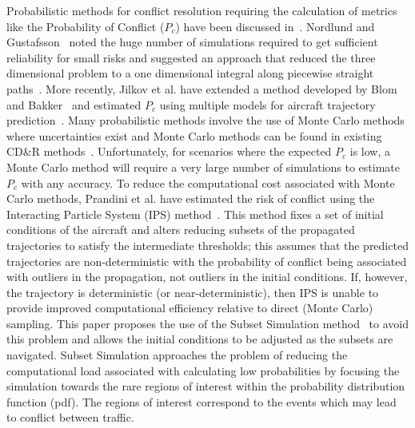 \documentclass[journal]{IEEEtran}
\begin{document}
Probabilistic methods for conflict resolution requiring the calculation of metrics like the Probability of Conflict ($P_{c}$) have been discussed in~\cite{kuchar2000review}. Nordlund and Gustafsson~\cite{Nordlund2011} noted the huge number of simulations required to get sufficient reliability for small risks and suggested an approach that reduced the three dimensional problem to a one dimensional integral along piecewise straight paths~\cite{nordlund2008probabilistic,Lindsten200965}.
More recently, Jilkov et al. have extended a method developed by Blom and Bakker~\cite{blom2002conflict} and estimated $P_{c}$ using multiple models for aircraft trajectory prediction~\cite{jilkov2014improved}. Many probabilistic methods involve the use of Monte Carlo methods where uncertainties exist and Monte Carlo methods can be found in existing CD\&R methods~\cite{jilkov2014improved,chryssanthacopoulos2011accounting,wolf2011aircraft,belkhouche2013modeling,blom2006free,Watkins2003Stochastic,prandini2000probabilistic,Krozel1997Decision}. Unfortunately, for scenarios where the expected $P_{c}$ is low, a Monte Carlo method will require a very large number of simulations to estimate $P_{c}$ with any accuracy. To reduce the computational cost associated with Monte Carlo methods, Prandini et al. have estimated the risk of conflict using the Interacting Particle System (IPS) method~\cite{prandini2011air}. This method fixes a set of initial conditions of the aircraft and alters reducing subsets of the propagated trajectories to satisfy the intermediate thresholds; this assumes that the predicted trajectories are non-deterministic with the probability of conflict being associated with outliers in the propagation, not outliers in the initial conditions. If, however, the trajectory is deterministic (or near-deterministic), then IPS is unable to provide improved computational efficiency relative to direct (Monte Carlo) sampling. This paper proposes the use of the Subset Simulation method~\cite{au2001estimation} to avoid this problem and allows the initial conditions to be adjusted as the subsets are navigated. Subset Simulation approaches the problem of reducing the computational load associated with calculating low probabilities by focusing the simulation towards the rare regions of interest within the probability distribution function (pdf). The regions of interest correspond to the events which may lead to conflict between traffic. 
\end{document}

